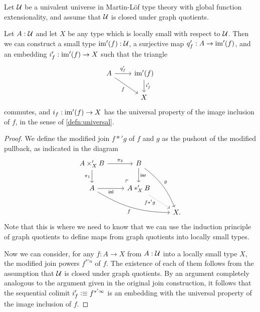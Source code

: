 \begin{thm}\label{thm:modified-join}
Let $\mathcal{U}$ be a univalent universe in Martin-L\"of type theory with global function extensionality, 
and assume that $\mathcal{U}$ is closed under graph quotients. 

Let $A:\mathcal{U}$ and let $X$ be any type which is locally small with respect to $\mathcal{U}$.
Then we can construct a small type $\operatorname{im}'(f):\mathcal{U}$, a surjective map $q'_f:A\to\operatorname{im}'(f)$, and an embedding $i'_f:\operatorname{im}'(f)\to X$ such that the triangle
\begin{equation*}
\begin{tikzcd}
A \arrow[r,"{q'_f}"] \arrow[dr,swap,"f"] & \im'(f) \arrow[d,"{i'_f}"] \\
& X
\end{tikzcd}
\end{equation*}
commutes, and $i_f:\operatorname{im}'(f)\to X$ has the universal property of the image inclusion of $f$, in the sense of \autoref{defn:universal}.
\end{thm}

\begin{proof}
We define the modified join $f \ast' g$ of $f$ and $g$ as the pushout of the
modified pullback, as indicated in the diagram
\begin{equation*}
\begin{tikzcd}
A\times_X' B \arrow[r,"\pi_2"] \arrow[d,swap,"\pi_1"] \arrow[dr, phantom, "{\ulcorner}", at end] & B \arrow[d,"\inr"] \arrow[ddr,bend left=15,"g"] \\
A \arrow[r,swap,"\inl"] \arrow[drr,bend right=15,swap,"f"] & A\ast_X' B \arrow[dr,densely dotted,swap,near start,"{f \ast' g}" xshift=1ex] \\
& & X.
\end{tikzcd}
\end{equation*}
Note that this is where we need to know that we can use the induction principle
of graph quotients to define maps from graph quotients into locally small types.

Now we can consider, for any $f:A\to X$ from $A:\mathcal{U}$ into a locally small type
$X$, the modified join powers $f^{\ast'n}$ of $f$. The existence of each of
them follows from the assumption that $\mathcal{U}$ is closed under graph quotients.
By an argument completely analogous to the argument given in the original join
construction, it follows that the sequential colimit
$i'_f\vcentcolon\equiv f^{\ast'\infty}$ is an embedding with the universal property of the image 
inclusion of $f$. 
\end{proof}

